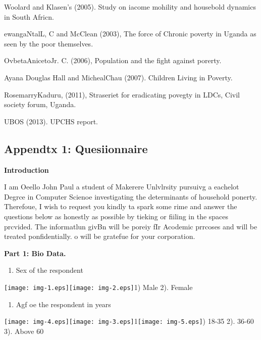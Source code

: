 \documentclass[12pt]{article}
\begin{document}
Woolard and Klasen's (2005). Study on iacome mohility and housebold dynamics in
South Africn.

ewangaNtalL, C and McClean (2003), The force of Chronic poverty in Uganda as
seen by the poor themselves.

OvbetaAnicetoJr. C. (2006), Population and the fight against porerty.

Ayana Douglas Hall and MichealChau (2007). Children Living in Poverty.

RosemarryKaduru, (2011), Straseriet for eradicating povegty in LDCs, Civil
society forum, Uganda.

UBOS (2013). UPCHS report.

\subsection{Appendtx 1: Quesiionnaire}

\textbf{Introduction}

I am Oeello John Paul a student of Makerere Unlvlrsity pursuivg a eachelot
Degrce in Computer Scienoe investigating the determinants of household ponerty.
Therefoue, I wish to request you kindly ta spark some rime and answer the
questions below as honestly as possible by tieking or fiiling in the spaces
prcvided. The informatlun givBn will be poreiy fIr Acodemic prrcoses and will be
treated ponfidentially. o will be gratefue for your corporation.

\textbf{Part 1: Bio Data.}

\begin{enumerate}
	\item Sex of the respondent
\end{enumerate}

\texttt{[image: img-1.eps]}\texttt{[image: img-2.eps]}1)
Male                         2). Female

\begin{enumerate}
	\item Agf oe the respondent in years
\end{enumerate}

\texttt{[image: img-4.eps]}\texttt{[image: img-3.eps]}1\texttt{[image: img-5.eps]})
18-35           2). 36-60           3). Above 60
\end{document}
